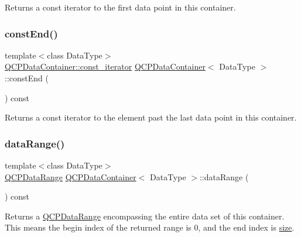 Returns a const iterator to the first data point in this container. \mbox{\label{class_q_c_p_data_container_aa7f7cf239b85b1a28de3d675cc5b3da1}} 
\subsubsection{\texorpdfstring{constEnd()}{constEnd()}}
{\footnotesize\ttfamily template$<$class Data\+Type$>$ \\
\mbox{\hyperlink{class_q_c_p_data_container_ae40a91f5cb0bcac61d727427449b7d15}{Q\+C\+P\+Data\+Container\+::const\+\_\+iterator}} \mbox{\hyperlink{class_q_c_p_data_container}{Q\+C\+P\+Data\+Container}}$<$ Data\+Type $>$\+::const\+End (\begin{DoxyParamCaption}{ }\end{DoxyParamCaption}) const\hspace{0.3cm}{\ttfamily [inline]}}

Returns a const iterator to the element past the last data point in this container. \mbox{\label{class_q_c_p_data_container_aece90eeb2ba8d3c46d3d94023630fbc7}} 
\subsubsection{\texorpdfstring{dataRange()}{dataRange()}}
{\footnotesize\ttfamily template$<$class Data\+Type$>$ \\
\mbox{\hyperlink{class_q_c_p_data_range}{Q\+C\+P\+Data\+Range}} \mbox{\hyperlink{class_q_c_p_data_container}{Q\+C\+P\+Data\+Container}}$<$ Data\+Type $>$\+::data\+Range (\begin{DoxyParamCaption}{ }\end{DoxyParamCaption}) const\hspace{0.3cm}{\ttfamily [inline]}}

Returns a \mbox{\hyperlink{class_q_c_p_data_range}{Q\+C\+P\+Data\+Range}} encompassing the entire data set of this container. This means the begin index of the returned range is 0, and the end index is \mbox{\hyperlink{class_q_c_p_data_container_a8e9b262c739672e13472d0d45b720258}{size}}. \mbox{\label{class_q_c_p_data_container_acf66dfad83fe041380f5e0491e7676f2}} 

